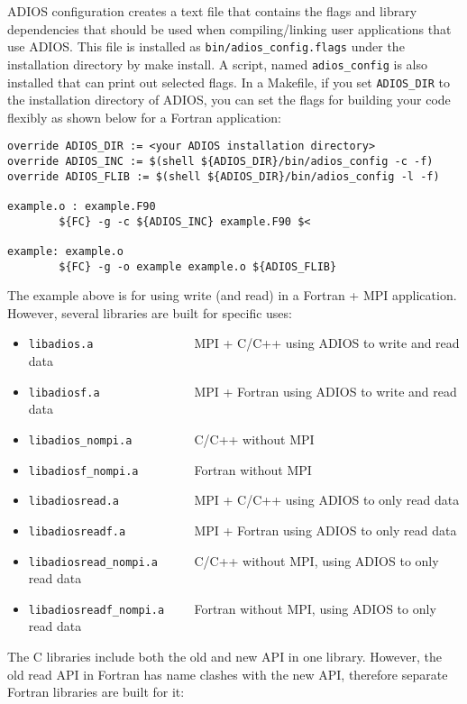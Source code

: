 ADIOS configuration creates a text file that contains the flags and library dependencies
that should be used when compiling/linking user applications that use ADIOS. This
file is installed as \verb+bin/adios_config.flags+ under the installation directory by
make install. A script, named \verb+adios_config+ is also installed that can print out
selected flags. In a Makefile, if you set \verb+ADIOS_DIR+ to the installation directory
of ADIOS, you can set the flags for building your code flexibly as shown below
for a Fortran application:

\begin{lstlisting}
override ADIOS_DIR := <your ADIOS installation directory>
override ADIOS_INC := $(shell ${ADIOS_DIR}/bin/adios_config -c -f)
override ADIOS_FLIB := $(shell ${ADIOS_DIR}/bin/adios_config -l -f)

example.o : example.F90
        ${FC} -g -c ${ADIOS_INC} example.F90 $<

example: example.o
        ${FC} -g -o example example.o ${ADIOS_FLIB}
\end{lstlisting}

The example above is for using write (and read) in a Fortran + MPI application. However, several libraries are built for specific uses:

\begin{itemize}
\item \verb+libadios.a               +   MPI + C/C++ using ADIOS to write and read data
\item \verb+libadiosf.a              +   MPI + Fortran using ADIOS to write and read data
\item \verb+libadios_nompi.a         +   C/C++ without MPI
\item \verb+libadiosf_nompi.a        +   Fortran without MPI
\item \verb+libadiosread.a           +   MPI + C/C++ using ADIOS to only read data
\item \verb+libadiosreadf.a          +   MPI + Fortran using ADIOS to only read data
\item \verb+libadiosread_nompi.a     +   C/C++ without MPI, using ADIOS to only read data
\item \verb+libadiosreadf_nompi.a    +   Fortran without MPI, using ADIOS to only read data
\end{itemize}

The C libraries include both the old and new API in one library. However, the old read API in Fortran has name clashes with the new API, therefore separate Fortran libraries are built for it:

